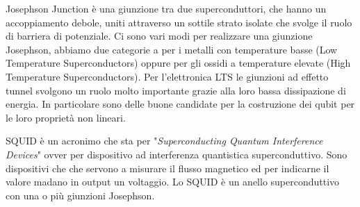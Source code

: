 Josephson Junction è una giunzione tra due superconduttori, che hanno un accoppiamento debole, uniti attraverso un sottile strato isolate che svolge il ruolo di barriera di potenziale. Ci sono vari modi per realizzare una giunzione Josephson, abbiamo due categorie a per i metalli con temperature basse  (Low Temperature Superconductors) oppure per gli ossidi a temperature elevate  (High Temperature Superconductors). Per l'elettronica LTS le giunzioni ad effetto tunnel svolgono un ruolo molto importante grazie alla loro bassa dissipazione di energia. In particolare sono delle buone candidate per la costruzione dei qubit per le loro proprietà non lineari.

SQUID è un acronimo che sta per "\textit{Superconducting Quantum Interference Devices}" ovver per dispositivo ad interferenza quantistica superconduttivo. Sono dispositivi che che servono a misurare il flusso magnetico ed per indicarne il valore madano in output un voltaggio. Lo SQUID è un anello superconduttivo con una o più giunzioni Josephson.


